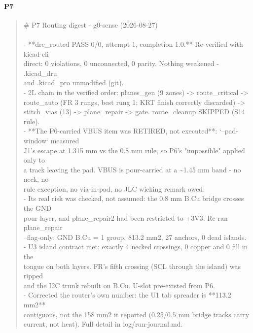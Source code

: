 \documentclass[11pt,a4paper]{article}
\begin{document}
\paragraph*{P7}
\begin{quote}\small\ttfamily\raggedright
\# P7 Routing digest - g0-sense (2026-08-27)\\
~\\
- {*}{*}drc\_routed PASS 0/0, attempt 1, completion 1.0.{*}{*} Re-verified with kicad-cli\\
  direct: 0 violations, 0 unconnected, 0 parity. Nothing weakened - .kicad\_dru\\
  and .kicad\_pro unmodified (git).\\
- 2L chain in the verified order: planes\_gen (9 zones) -\textgreater{} route\_critical -\textgreater{}\\
  route\_auto (FR 3 rungs, best rung 1; KRT finish correctly discarded) -\textgreater{}\\
  stitch\_vias (13) -\textgreater{} plane\_repair -\textgreater{} gate. route\_cleanup SKIPPED (S14 rule).\\
- {*}{*}The P6-carried VBUS item was RETIRED, not executed{*}{*}: `--pad-window` measured\\
  J1's escape at 1.315 mm vs the 0.8 mm rule, so P6's "impossible" applied only to\\
  a track leaving the pad. VBUS is pour-carried at a \textasciitilde{}1.45 mm band - no neck, no\\
  rule exception, no via-in-pad, no JLC wicking remark owed.\\
- Its real risk was checked, not assumed: the 0.8 mm B.Cu bridge crosses the GND\\
  pour layer, and plane\_repair2 had been restricted to +3V3. Re-ran plane\_repair\\
  --flag-only: GND B.Cu = 1 group, 813.2 mm2, 27 anchors, 0 dead islands.\\
- U3 island contract met: exactly 4 necked crossings, 0 copper and 0 fill in the\\
  tongue on both layers. FR's fifth crossing (SCL through the island) was ripped\\
  and the I2C trunk rebuilt on B.Cu. U-slot pre-existed from P6.\\
- Corrected the router's own number: the U1 tab spreader is {*}{*}113.2 mm2{*}{*}\\
  contiguous, not the 158 mm2 it reported (0.25/0.5 mm bridge tracks carry\\
  current, not heat). Full detail in log/run-journal.md.
\end{quote}
\end{document}
